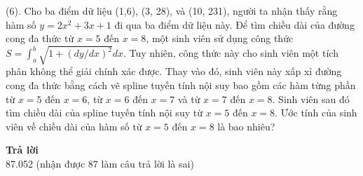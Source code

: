 (6). Cho ba điểm dữ liệu (1,6), (3, 28), và (10, 231), người ta nhận thấy rằng hàm số $y=2x^2+3x+1$ đi qua ba điểm dữ liệu này. Để tìm chiều dài của đường cong đa thức từ $x=5$ đến $x=8$, một sinh viên sử dụng công thức $S=\int_{a}^{b}\sqrt{1+(dy/dx)^2}dx$. Tuy nhiên, công thức này cho sinh viên một tích phân không thể giải chính xác được. Thay vào đó, sinh viên này xấp xỉ đường cong đa thức bằng cách vẽ spline tuyến tính nội suy bao gồm các hàm từng phần từ $x=5$ đến $x=6$, từ $x=6$ đến $x=7$ và từ $x=7$ đến $x=8$. Sinh viên sau đó tìm chiều dài của spline tuyến tính nội suy từ $x=5$ đến $x=8$. Ước tính của sinh viên về chiều dài của hàm số từ $x=5$ đến $x=8$ là bao nhiêu?

\textbf{Trả lời} \\
87.052 (nhận được 87 làm câu trả lời là sai)


